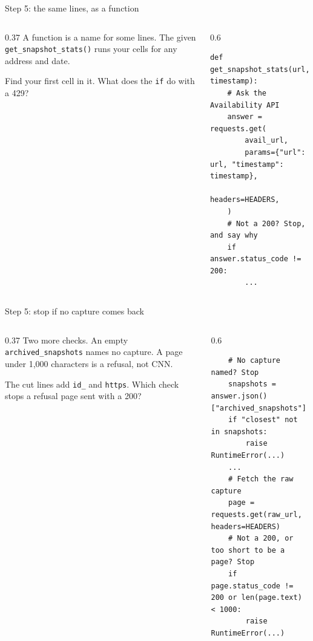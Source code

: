 \documentclass[9pt,aspectratio=169]{beamer}
\begin{document}
\begin{frame}[fragile]{Step 5: the same lines, as a function}
    \begin{columns}[T]
        \begin{column}{0.37\textwidth}
            A function is a name for some lines. The given \texttt{get\_snapshot\_stats()} runs your cells for any address and date.

            \medskip
            Find your first cell in it. What does the \texttt{if} do with a 429?
        \end{column}
        \begin{column}{0.6\textwidth}
\begin{lstlisting}
def get_snapshot_stats(url, timestamp):
    # Ask the Availability API
    answer = requests.get(
        avail_url,
        params={"url": url, "timestamp": timestamp},
        headers=HEADERS,
    )
    # Not a 200? Stop, and say why
    if answer.status_code != 200:
        ...
\end{lstlisting}
        \end{column}
    \end{columns}
\end{frame}

\begin{frame}[fragile]{Step 5: stop if no capture comes back}
    \begin{columns}[T]
        \begin{column}{0.37\textwidth}
            Two more checks. An empty \texttt{archived\_snapshots} names no capture. A page under 1,000 characters is a refusal, not CNN.

            \medskip
            The cut lines add \texttt{id\_} and \texttt{https}. Which check stops a refusal page sent with a 200?
        \end{column}
        \begin{column}{0.6\textwidth}
\begin{lstlisting}
    # No capture named? Stop
    snapshots = answer.json()["archived_snapshots"]
    if "closest" not in snapshots:
        raise RuntimeError(...)
    ...
    # Fetch the raw capture
    page = requests.get(raw_url, headers=HEADERS)
    # Not a 200, or too short to be a page? Stop
    if page.status_code != 200 or len(page.text) < 1000:
        raise RuntimeError(...)
\end{lstlisting}
        \end{column}
    \end{columns}
\end{frame}
\end{document}

